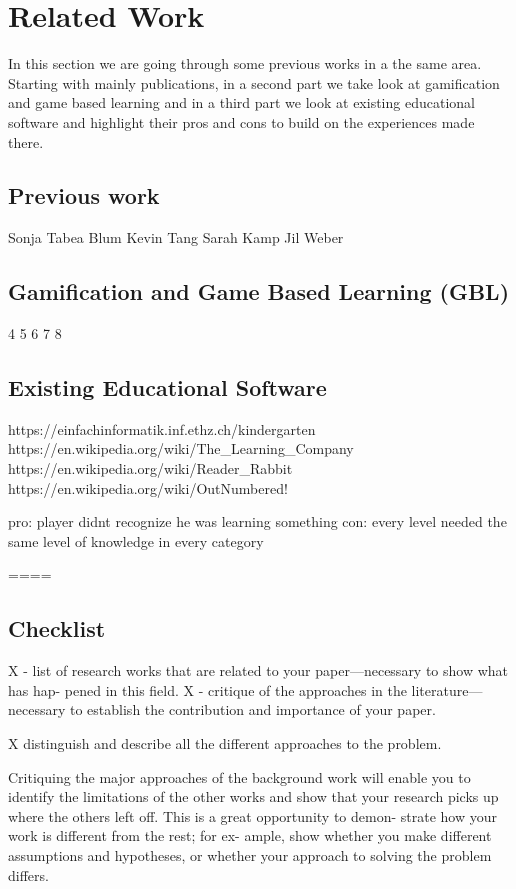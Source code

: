 
\setcounter{chapter}{0}

\chapter{Related Work}
\label{chap:relatedwork}

In this section we are going through some previous works in a the same area.
Starting with mainly publications, in a second part we take look at gamification
and game based learning and in a third part we look at existing educational software
and highlight their pros and cons to build on the experiences made there.

\section{Previous work}
Sonja Tabea Blum
Kevin Tang
Sarah Kamp
Jil Weber

\section{Gamification and Game Based Learning (GBL)}
4
5
6
7
8

\section{Existing Educational Software}
https://einfachinformatik.inf.ethz.ch/kindergarten
https://en.wikipedia.org/wiki/The_Learning_Company
https://en.wikipedia.org/wiki/Reader_Rabbit
https://en.wikipedia.org/wiki/OutNumbered!

pro: player didnt recognize he was learning something
con: every level needed the same level of knowledge in every category

====
\section{Checklist}
X - list of research works that are related to your paper—necessary to show what has hap-
pened in this field.
X - critique of the approaches in the literature—necessary to establish the
contribution and importance of your paper.

X distinguish and describe all the different approaches to the problem.

Critiquing the major approaches of the background
work will enable you to identify the limitations of the
other works and show that your research picks up where
the others left off. This is a great opportunity to demon-
strate how your work is different from the rest; for ex-
ample, show whether you make different assumptions
and hypotheses, or whether your approach to solving the
problem differs.

